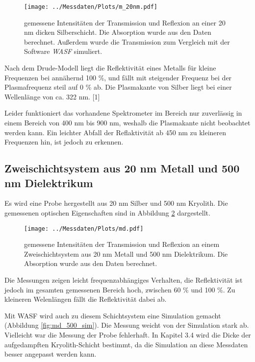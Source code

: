 \documentclass[10pt,twoside]{article}
\renewcommand{\1}{^{-1}}
\renewcommand{\2}{^{-2}}
\newcommand{\3}{^{-3}}
\newcommand{\4}{^{-4}}
\newcommand{\5}{^{-5}}
\newcommand{\6}{^{-6}}
\newcommand{\7}{^{-7}}
\newcommand{\8}{^{-8}}
\newcommand{\9}{^{-9}}
\begin{document}
\begin{figure}[H]
\centering
\texttt{[image: ../Messdaten/Plots/m\_20nm.pdf]} 
\caption{gemessene Intensitäten der Transmission und Reflexion an einer 20 nm dicken Silberschicht. Die Absorption wurde aus den Daten berechnet. Außerdem wurde die Transmission zum Vergleich mit der Software \textit{WASF} simuliert.}
\label{fig:m_20nm}
\end{figure}

Nach dem Drude-Modell liegt die Reflektivität eines Metalls für kleine Frequenzen bei annähernd 100 \%, und fällt mit steigender Frequenz bei der Plasmafrequenz steil auf 0 \% ab. Die Plasmakante von Silber liegt bei einer Wellenlänge von ca. 322 nm. [1] 

Leider funktioniert das vorhandene Spektrometer im Bereich nur zuverlässig in einem Bereich von 400 nm bis 900 nm, weshalb die Plasmakante nicht beobachtet werden kann. Ein leichter Abfall der Reflaktivität ab 450 nm zu kleineren Frequenzen hin, ist jedoch zu erkennen.

\newpage

\subsection{Zweischichtsystem aus 20 nm Metall und 500 nm Dielektrikum}

Es wird eine Probe hergestellt aus 20 nm Silber und 500 nm Kryolith.
Die gemessenen optischen Eigenschaften sind in Abbildung \ref{fig:md_500} dargestellt.

\begin{figure}[H]
\centering
\texttt{[image: ../Messdaten/Plots/md.pdf]} \caption{gemessene Intensitäten der Transmission und Reflexion an einem Zweischichtsystem aus 20 nm Metall und 500 nm Dielektrikum. Die Absorption wurde aus den Daten berechnet.}
\label{fig:md_500}
\end{figure}

Die Messungen zeigen leicht frequenzabhängiges Verhalten, die Reflektivität ist jedoch im gesamten gemessenen Bereich hoch, zwischen 60 \% und 100 \%.
Zu kleineren Welenlängen fällt die Reflektivität dabei ab.

Mit WASF wird auch zu diesem Schichtsystem eine Simulation gemacht (Abbildung \ref{fig:md_500_sim}).
Die Messung weicht von der Simulation stark ab. Vielleicht war die Messung der Probe fehlerhaft.
In Kapitel 3.4 wird die Dicke der aufgedampften Kryolith-Schicht bestimmt, da die Simulation an diese Messdaten besser angepasst werden kann.
\end{document}
